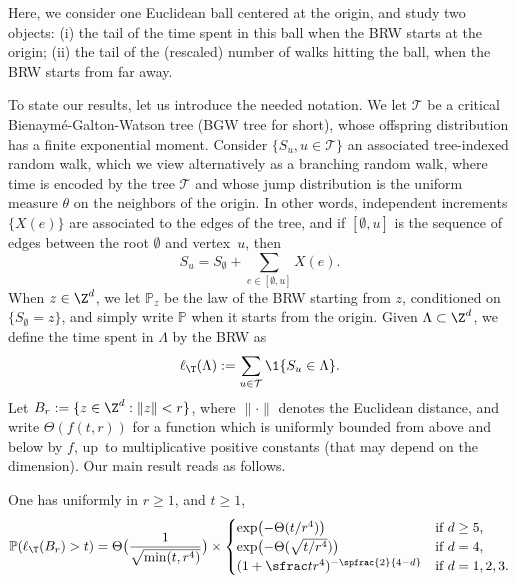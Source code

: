 Here, we consider one Euclidean ball centered at the origin, and study
two objects:
(i) the tail of the time spent in this ball when the
BRW starts at the origin;
(ii) the tail of the (rescaled) number of walks hitting the ball,
when the BRW starts from far away.

To state our results, let us introduce the needed notation. We let $\mathbf {\mathcal T}$ be a critical
Bienaymé-Galton-Watson tree (BGW tree for short),
whose offspring distribution has a finite exponential moment.
Consider $\{S_u, u\in \mathbf {\mathcal T}\}$
an associated tree-indexed random walk,
which we view alternatively as a branching random walk, where
time is encoded by the tree $\mathcal T$ and
whose jump distribution is the uniform measure $\theta$ on the neighbors of the origin.
In other words, independent
increments $\{X(e)\}$ are associated to the edges of the tree, and if
$[\emptyset,u]$ is the sequence of edges between the root $\emptyset$ and
vertex~$u$, then
\[
S_u=S_\emptyset+\sum_{e\in [\emptyset,u]}X(e).
\]
When $z\in \Z^d$, we let $\mathbb P_z$ be the law of the BRW
starting from $z$, \ie conditioned on $\{S_\emptyset=z\}$, and simply write $\mathbb P$ when it starts from the origin.
Given $\Lambda\subset \Z^d$, we define the time spent in $\Lambda$ by the BRW as
\begin{equation*}%
\ell_{\T}(\Lambda) := \sum_{u\in \mathcal T}
\1\{S_u \in \Lambda\}.
\end{equation*}
Let $B_r:=\{z\in \Z^d : \|z\|< r\}$, where $\|{\cdot}\|$
denotes the Euclidean distance, and
write $\Theta(f(t,r))$ for a function which is uniformly
bounded from above and below by $f$, up~to
multiplicative positive constants (that may depend on the dimension). Our main result reads as follows.

\begin{theorem} \label{theo.main}
One has uniformly in $r\ge 1$, and $t\ge 1$,
\begin{equation*}%
\mathbb P(\ell_{\T}(B_r) > t) =
\Theta\bigl(\frac{1}{\sqrt{\min(t,r^4)}}\bigr) \times
\begin{cases}
\exp \bigl(-\Theta(t/r^4)\bigr) & \text{if }d\ge 5, \\
\exp\bigl(- \Theta(\sqrt{ t/r^4})\bigr) & \text{if }d=4,\\
(1+\sfrac t{r^4})^{-\spfrac{2}{4-d}} & \text{if }d=1,2,3.
\end{cases}
\end{equation*}
\end{theorem}

